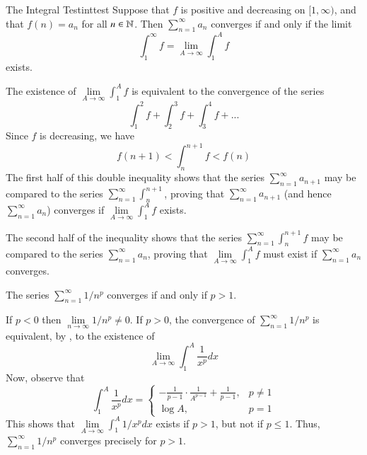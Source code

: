 \documentclass[12pt]{report}
\begin{document}
\begin{namthm}{The Integral Test}{inttest}
    Suppose that $f$ is positive and decreasing on $[1,\infty)$, and that $f(n) = a_n$ for all $n \in \mathbb N$. Then $\sum\limits_{n=1}^{\infty}a_n$ converges if and only if the limit \begin{equation*}
        \int_1^{\infty}f = \lim\limits_{A\rightarrow \infty}\int_1^Af
    \end{equation*}
    exists.
\end{namthm}
\begin{proof*}{}{}
    The existence of $\lim\limits_{A\rightarrow \infty}\int_1^Af$ is equivalent to the convergence of the series \begin{equation*}
        \int_1^2f + \int_2^3f + \int_3^4f + ...
    \end{equation*}
    Since $f$ is decreasing, we have \begin{equation*}
        f(n+1) < \int_n^{n+1}f < f(n) 
    \end{equation*}
    The first half of this double inequality shows that the series $\sum\limits_{n=1}^{\infty}a_{n+1}$ may be compared to the series $\sum\limits_{n=1}^{\infty}\int_n^{n+1}$, proving that $\sum\limits_{n=1}^{\infty}a_{n+1}$ (and hence $\sum\limits_{n=1}^{\infty}a_n$) converges if $\lim\limits_{A\rightarrow \infty}\int_1^Af$ exists.

    The second half of the inequality shows that the series $\sum\limits_{n=1}^{\infty}\int_n^{n+1}f$ may be compared to the series $\sum\limits_{n=1}^{\infty}a_n$, proving that $\lim\limits_{A\rightarrow \infty}\int_1^Af$ must exist if $\sum\limits_{n=1}^{\infty}a_n$ converges.
\end{proof*}


\begin{cor}{}{}
    The series $\sum\limits_{n=1}^{\infty}1/n^p$ converges if and only if $p > 1$.
\end{cor}
\begin{proof*}{}{}
    If $p < 0$ then $\lim\limits_{n\rightarrow \infty}1/n^p \neq 0$. If $p > 0$, the convergence of $\sum\limits_{n=1}^{\infty}1/n^p$ is equivalent, by , to the existence of \begin{equation*}
        \lim\limits_{A\rightarrow\infty}\int_1^A\frac{1}{x^p}dx
    \end{equation*}
    Now, observe that \begin{equation*}
        \int_1^A\frac{1}{x^p}dx = \left\{\begin{array}{lc} -\frac{1}{p-1}\cdot\frac{1}{A^{p-1}} + \frac{1}{p-1}, & p \neq 1 \\ \log A, & p = 1\end{array}\right.
    \end{equation*}
    This shows that $\lim\limits_{A\rightarrow \infty}\int_1^A1/x^pdx$ exists if $p > 1$, but not if $p \leq 1$. Thus, $\sum\limits_{n=1}^{\infty}1/n^p$ converges precisely for $p > 1$. 
\end{proof*}
\end{document}
